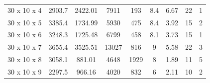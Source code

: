\documentclass{article}
\begin{document}
\begin{table}[]
\begin{tabular}{lcccccccc}
	     		30 x 10 x 4                     & 2903.7                       & 2422.01                      & 7911                     & 193                      & 8.4                          & 6.67                         & 22                       & 1                        \\
	     		30 x 10 x 5                     & 3385.4                       & 1734.99                      & 5930                     & 475                      & 8.4                          & 3.92                         & 15                       & 2                        \\
	     		30 x 10 x 6                     & 3248.3                       & 1725.48                      & 6799                     & 458                      & 8.1                          & 3.73                         & 15                       & 1                        \\
	     		30 x 10 x 7                     & 3655.4                       & 3525.51                      & 13027                    & 816                      & 9                            & 5.58                         & 22                       & 3                        \\
	     		30 x 10 x 8                     & 3058.1                       & 881.01                       & 4648                     & 1929                     & 8                            & 1.89                         & 11                       & 5                        \\
	     		30 x 10 x 9                     & 2297.5                       & 966.16                       & 4020                     & 832                      & 6                            & 2.11                         & 10                       & 2                       
	     	\end{tabular}
	     \end{table}
	     
	     
	     
	     
\end{document}
